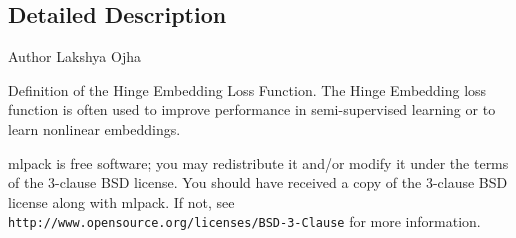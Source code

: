\subsection{Detailed Description}
\begin{DoxyAuthor}{Author}
Lakshya Ojha
\end{DoxyAuthor}
Definition of the Hinge Embedding Loss Function. The Hinge Embedding loss function is often used to improve performance in semi-\/supervised learning or to learn nonlinear embeddings.

mlpack is free software; you may redistribute it and/or modify it under the terms of the 3-\/clause B\+SD license. You should have received a copy of the 3-\/clause B\+SD license along with mlpack. If not, see {\tt http\+://www.\+opensource.\+org/licenses/\+B\+S\+D-\/3-\/\+Clause} for more information. 